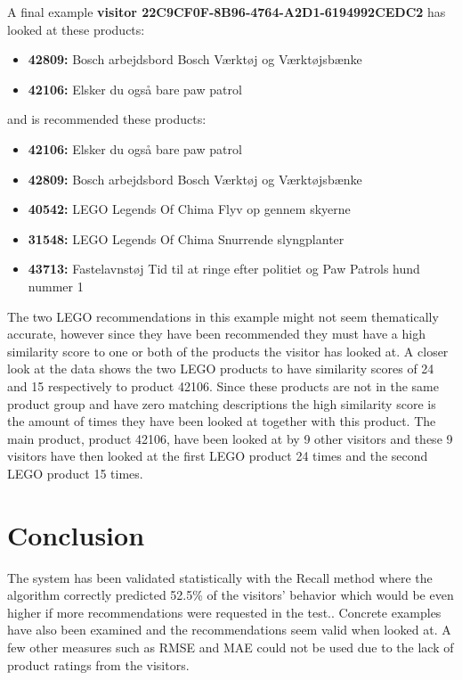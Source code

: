 A final example \textbf{visitor 22C9CF0F-8B96-4764-A2D1-6194992CEDC2} has looked at these products:
\begin{itemize}
\item \textbf{42809: }Bosch arbejdsbord Bosch Værktøj og Værktøjsbænke
\item \textbf{42106: }Elsker du også bare paw patrol
\end{itemize}
and is recommended these products:
\begin{itemize}
\item \textbf{42106: }Elsker du også bare paw patrol
\item \textbf{42809: }Bosch arbejdsbord Bosch Værktøj og Værktøjsbænke
\item \textbf{40542: }LEGO Legends Of Chima Flyv op gennem skyerne
\item \textbf{31548:} LEGO Legends Of Chima Snurrende slyngplanter
\item \textbf{43713:} Fastelavnstøj Tid til at ringe efter politiet og Paw Patrols hund nummer 1
\end{itemize}
The two LEGO recommendations in this example might not seem thematically accurate, however since they have been recommended they must have a high similarity score to one or both of the products the visitor has looked at. A closer look at the data shows the two LEGO products to have similarity scores of 24 and 15 respectively to product 42106. Since these products are not in the same product group and have zero matching descriptions the high similarity score is the amount of times they have been looked at together with this product. The main product, product 42106, have been looked at by 9 other visitors and these 9 visitors have then looked at the first LEGO product 24 times and the second LEGO product 15 times.

\section{Conclusion}
The system has been validated statistically with the Recall method where the algorithm correctly predicted 52.5\% of the visitors' behavior which would be even higher if more recommendations were requested in the test.. Concrete examples have also been examined and the recommendations seem valid when looked at. A few other measures such as RMSE and MAE could not be used due to the lack of product ratings from the visitors.

 